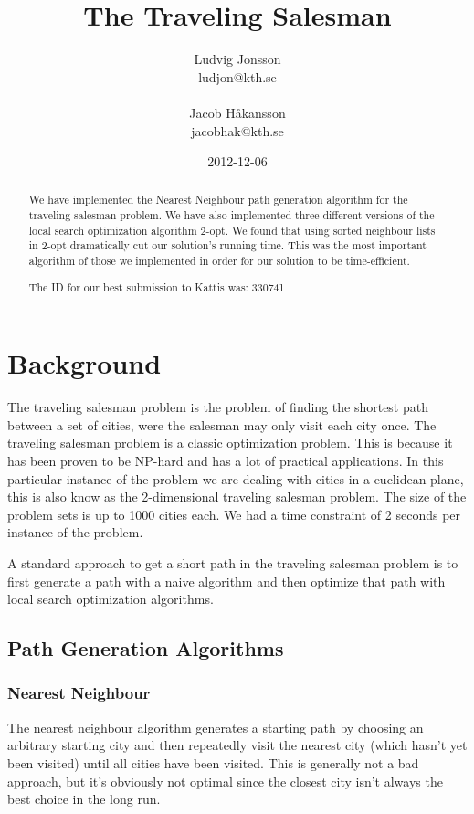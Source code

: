 \documentclass[article,11pt]{article}
\title{The Traveling Salesman}
\author{Ludvig Jonsson\\ludjon@kth.se
\\\\
Jacob Håkansson \\ jacobhak@kth.se}
\date{2012-12-06}
\begin{document}
\maketitle
{}

\newpage
{}
\pagestyle{plain}

\begin{abstract}
We have implemented the Nearest Neighbour path generation algorithm
for the traveling salesman problem. We have also implemented three
different versions of the local search optimization algorithm
2-opt. We found that using sorted neighbour lists in 2-opt
dramatically cut our solution’s running time. This was the most
important algorithm of those we implemented in order for our solution
to be time-efficient.

The ID for our best submission to Kattis was: 330741
\end{abstract}
\newpage
\tableofcontents
\newpage

\section{Background}
The traveling salesman problem is the problem of finding the shortest
path between a set of cities, were the salesman may only visit each
city once. The traveling salesman problem is a classic optimization
problem. This is because it has been proven to be NP-hard and has a
lot of practical applications. In this particular instance of the
problem we are dealing with cities in a euclidean plane, this is also
know as the 2-dimensional traveling salesman problem. The size of the
problem sets is up to 1000 cities each. We had a time constraint of 2
seconds per instance of the problem. 

A standard approach to get a short path in the traveling salesman
problem is to first generate a path with a naive algorithm and then
optimize that path with local search optimization algorithms.
\subsection{Path Generation Algorithms}
\subsubsection{Nearest Neighbour}
The nearest neighbour algorithm generates a starting path by choosing
an arbitrary starting city and then repeatedly visit the nearest city
(which hasn’t yet been visited) until all cities have been
visited. This is generally not a bad approach, but it’s obviously not
optimal since the closest city isn’t always the best choice in the
long run. 
\end{document}
